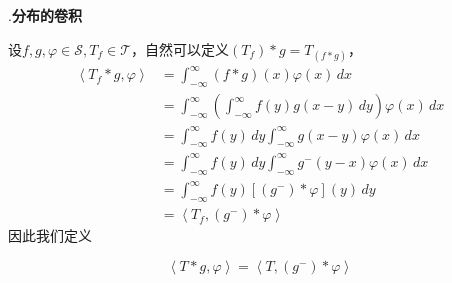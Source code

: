 .\textbf{分布的卷积}

设$f,g,\varphi\in\mathcal{S} ,T_f\in\mathcal{T} $，自然可以定义$(T_f)*g=T_{(f*g)}$，
\begin{align*}
    \left\langle T_f*g,\varphi\right\rangle & =\int_{-\infty}^{\infty}(f*g)(x)\varphi(x)\,dx                                           \\
                                 & =\int_{-\infty}^{\infty}\left(\int_{-\infty}^{\infty}f(y)g(x-y)\,dy\right)\varphi(x)\,dx \\
                                 & =\int_{-\infty}^{\infty}f(y)\,dy\int_{-\infty}^{\infty}g(x-y)\varphi(x)\,dx              \\
                                 & =\int_{-\infty}^{\infty}f(y)\,dy\int_{-\infty}^{\infty}g^- (y-x)\varphi(x)\,dx           \\
                                 & =\int_{-\infty}^{\infty}f(y)[(g^-) *\varphi](y)\,dy                                      \\
                                 & =\left\langle T_f,(g^-)*\varphi\right\rangle
\end{align*}
因此我们定义\begin{definition}[分布与函数的卷积]
    \[\left\langle T*g,\varphi\right\rangle=\left\langle T,(g^-)*\varphi\right\rangle\]
\end{definition}

